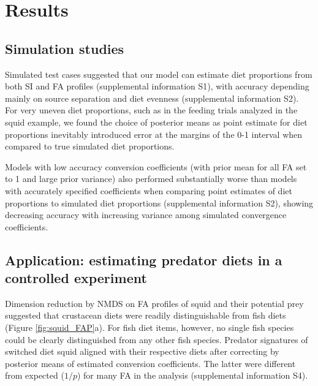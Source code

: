 \documentclass[fleqn,10pt]{wlpeerj}
\begin{document}
\section*{Results}

\subsection*{Simulation studies}
Simulated test cases suggested that our model can estimate diet
proportions from both SI and FA profiles (supplemental information S1), with
accuracy depending mainly on source separation and diet evenness (supplemental information S2). For very
uneven diet proportions, such as in the feeding trials analyzed in the
squid example, we found the choice of posterior means as point estimate for diet
proportions inevitably introduced error at the margins of
the 0-1 interval when compared to true simulated diet
proportions.

Models with low accuracy conversion coefficients (with prior mean for
all FA set to 1 and large prior variance) also performed substantially
worse than models with accurately specified coefficients when
comparing point estimates of diet proportions to simulated diet
proportions (supplemental information S2), showing decreasing accuracy with increasing variance among simulated convergence coefficients.

\subsection*{Application: estimating predator diets in a controlled
  experiment}

Dimension reduction by NMDS on FA profiles of squid and their potential prey suggested that crustacean diets were
readily distinguishable from fish diets
(Figure \ref{fig:squid_FAP}a). For fish diet items, however, no single
fish species could be clearly distinguished from any other fish species. Predator signatures of switched diet squid aligned with their
respective diets after correcting by posterior means of estimated conversion
coefficients. The latter were different from expected ($1/p$) for many
FA in the analysis (supplemental information S4).
\end{document}
